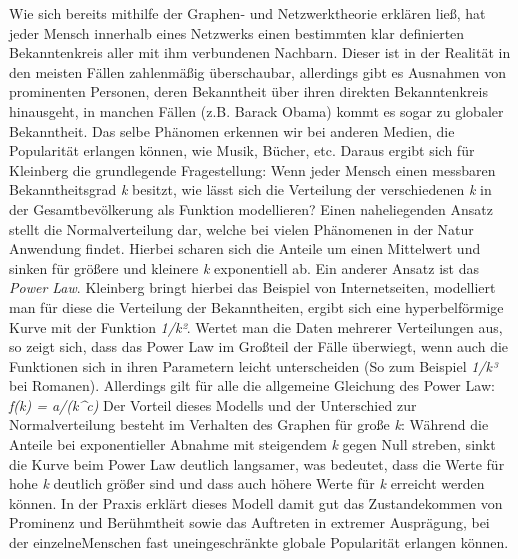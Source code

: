 Wie sich bereits mithilfe der Graphen- und Netzwerktheorie erklären ließ, hat jeder Mensch innerhalb eines Netzwerks einen bestimmten klar definierten Bekanntenkreis aller mit ihm verbundenen Nachbarn.
Dieser ist in der Realität in den meisten Fällen zahlenmäßig überschaubar, allerdings gibt es Ausnahmen von prominenten Personen, deren Bekanntheit über ihren direkten Bekanntenkreis hinausgeht, in manchen Fällen (z.B. Barack Obama) kommt es sogar zu globaler Bekanntheit.
Das selbe Phänomen erkennen wir bei anderen Medien, die Popularität erlangen können, wie Musik, Bücher, etc.
Daraus ergibt sich für Kleinberg die grundlegende Fragestellung:
Wenn jeder Mensch einen messbaren Bekanntheitsgrad \emph{k} besitzt, wie lässt sich die Verteilung der verschiedenen \emph{k} in der Gesamtbevölkerung als Funktion modellieren?
Einen naheliegenden Ansatz stellt die Normalverteilung dar, welche bei vielen Phänomenen in der Natur Anwendung findet. Hierbei scharen sich die Anteile um einen Mittelwert und sinken für größere und kleinere \emph{k} exponentiell ab.
Ein anderer Ansatz ist das \emph{Power Law}.
Kleinberg bringt hierbei das Beispiel von Internetseiten, modelliert man für diese die Verteilung der Bekanntheiten, ergibt sich eine hyperbelförmige Kurve mit der Funktion \emph{1/k²}.
 Wertet man die Daten mehrerer Verteilungen aus, so zeigt sich, dass das Power Law im Großteil der Fälle überwiegt, wenn auch die Funktionen sich in ihren Parametern leicht unterscheiden (So zum Beispiel \emph{1/k³} bei Romanen).
Allerdings gilt für alle die allgemeine Gleichung des Power Law:
\emph{f(k) = a/(k^c)}
Der Vorteil dieses Modells und der Unterschied zur Normalverteilung besteht im Verhalten des Graphen für große \emph{k}:
Während die Anteile bei exponentieller Abnahme mit steigendem \emph{k} gegen Null streben, sinkt die Kurve beim Power Law deutlich langsamer, was bedeutet, dass die Werte für hohe \emph{k} deutlich größer sind und dass auch höhere Werte für \emph{k} erreicht werden können. In der Praxis erklärt dieses Modell damit gut das Zustandekommen von Prominenz und Berühmtheit sowie das Auftreten in extremer Ausprägung, bei der einzelneMenschen fast uneingeschränkte globale Popularität erlangen können.
